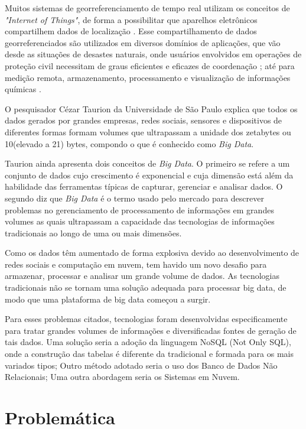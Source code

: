 Muitos sistemas de georreferenciamento de tempo real utilizam os conceitos de \textit{"Internet of Things"}, de forma a possibilitar que aparelhos eletrônicos compartilhem dados de localização \cite{Vega}. Esse compartilhamento de dados georreferenciados são utilizados em diversos domínios de aplicações, que vão desde as situações de desastes naturais, onde usuários envolvidos em operações de proteção civil necessitam de graus eficientes e eficazes de coordenação \cite{Barroso}; até para medição remota, armazenamento, processamento e visualização de informações químicas \cite{Vega}.

O pesquisador Cézar Taurion da Universidade de São Paulo explica que todos os dados gerados por grandes empresas, redes sociais, sensores e dispositivos de diferentes formas formam volumes que ultrapassam a unidade dos zetabytes ou 10(elevado a 21) bytes\cite{Taurion-big-data}, compondo o que é conhecido como \textit{Big Data}.

Taurion ainda apresenta dois conceitos de \textit{Big Data}. O primeiro se refere a um conjunto de dados cujo crescimento é exponencial e cuja dimensão está além da habilidade das ferramentas típicas de capturar, gerenciar e analisar dados\cite{Taurion-big-data}. O segundo diz que \textit{Big Data} é o termo usado pelo mercado para descrever problemas no gerenciamento de processamento de informações em grandes volumes as quais ultrapassam a capacidade das tecnologias de informações tradicionais ao longo de uma ou mais dimensões\cite{Taurion-big-data}.

Como os dados têm aumentado de forma explosiva devido ao desenvolvimento de redes sociais e computação em nuvem, tem havido um novo desafio para armazenar, processar e analisar um grande volume de dados. As tecnologias tradicionais não se tornam uma solução adequada para processar big data, de modo que uma plataforma de big data começou a surgir\cite{Park-Big-Data}. 

Para esses problemas citados, tecnologias foram desenvolvidas especificamente para tratar grandes volumes de informações e diversificadas fontes de geração de tais dados. Uma solução seria a adoção da linguagem NoSQL (Not Only SQL), onde a construção das tabelas é diferente da tradicional e formada para os mais variados tipos; Outro método adotado seria o uso dos Banco de Dados Não Relacionais; Uma outra abordagem seria os Sistemas em Nuvem\cite{Taurion-big-data}.
 
\section{Problemática}

